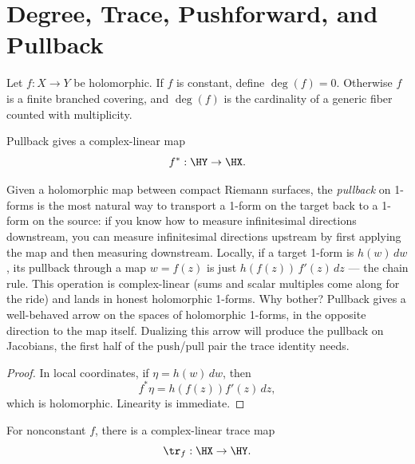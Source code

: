 \section{Degree, Trace, Pushforward, and Pullback}
\label{sec:degree-trace}

Let \(f:X\to Y\) be holomorphic. If \(f\) is constant, define
\(\deg(f)=0\). Otherwise \(f\) is a finite branched covering, and
\(\deg(f)\) is the cardinality of a generic fiber counted with multiplicity.

\begin{lemma}
\label{lem:pullback-forms}
Pullback gives a complex-linear map
\[
  f^{*}:\HY\to\HX.
\]
\leanok
\end{lemma}

\begin{layman}
Given a holomorphic map between compact Riemann surfaces, the
\emph{pullback} on 1-forms is the most natural way to transport a
1-form on the target back to a 1-form on the source: if you know how
to measure infinitesimal directions downstream, you can measure
infinitesimal directions upstream by first applying the map and then
measuring downstream. Locally, if a target 1-form is \(h(w)\,dw\), its
pullback through a map \(w = f(z)\) is just \(h(f(z))\,f'(z)\,dz\) —
the chain rule. This operation is complex-linear (sums and scalar
multiples come along for the ride) and lands in honest holomorphic
1-forms. Why bother? Pullback gives a well-behaved arrow on the spaces
of holomorphic 1-forms, in the opposite direction to the map itself.
Dualizing this arrow will produce the pullback on Jacobians, the first
half of the push/pull pair the trace identity needs.
\end{layman}

\begin{proof}
\leanok
In local coordinates, if \(\eta=h(w)\,dw\), then
\[
  f^{*}\eta = h(f(z))f'(z)\,dz,
\]
which is holomorphic. Linearity is immediate.
\end{proof}

\begin{lemma}
\label{lem:trace-forms}
For nonconstant \(f\), there is a complex-linear trace map
\[
  \tr_f:\HX\to\HY.
\]
\leanok
\end{lemma}

